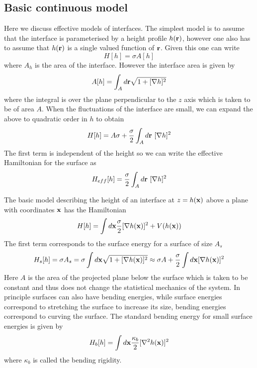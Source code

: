 \subsection{Basic continuous model}

Here we discuss effective models of interfaces. The simplest model is to assume that the 
interface is parameterised by a height profile $h({\bf r})$, however one also has to assume that 
$h({\bf r})$ is a single valued function of ${\bf r}$. Given this one can write
\begin{equation}
    H[h] = \sigma A[h]
\end{equation}
where $A_h$ is the area of the interface. However the interface area is given by
\begin{equation}
    A[h] = \int_A d{\bf r}\sqrt{1+[\nabla h]^2}
\end{equation}
where the integral is over the plane perpendicular to the $z$ axis which is taken to be of area $A$. When the fluctuations of the interface are small, we can expand the above to quadratic order in $h$ to obtain
\begin{equation}
    H[h]= A\sigma +\frac{\sigma}{2} \int_A d{\bf r} \ [\nabla h]^2
\end{equation}
The first term is independent of the height so we can write the effective Hamiltonian for the surface as
\begin{equation}
    H_{eff} [h]= \frac{\sigma}{2} \int_A d{\bf r}\  [\nabla h]^2
    \label{heff}
\end{equation}

The basic model describing the height of an interface at $z=h({\bf x})$ above a plane with coordinates ${\bf x}$ has the Hamiltonian 
\begin{equation}
    H[h] = \int d{\bf x}\frac{\sigma}{2} [\nabla h({\bf x})]^2 + V(h({\bf x}))
\end{equation}
The first term corresponds to the surface energy for a surface of size $A_s$ 
\begin{equation}
    H_s[h] = \sigma A_s =\sigma\int d{\bf x} \sqrt{1+[\nabla h({\bf x})]^2}\approx \sigma A + \frac{\sigma}{2}\int d{\bf x} [\nabla h({\bf x})]^2 
\end{equation}
Here $A$ is the area of the projected plane below the surface which is taken to be constant and thus does not change the statistical mechanics of the system. In principle surfaces can also have bending energies, while surface energies correspond to stretching the surface to increase its size, bending energies correspond to curving the surface. The standard bending energy for small surface energies is given by
\begin{equation}
    H_b[h] = \int d{\bf x} \frac{\kappa_b}{2}[\nabla^2 h({\bf x})]^2
\end{equation} 
where $\kappa_b$ is called the bending rigidity.

